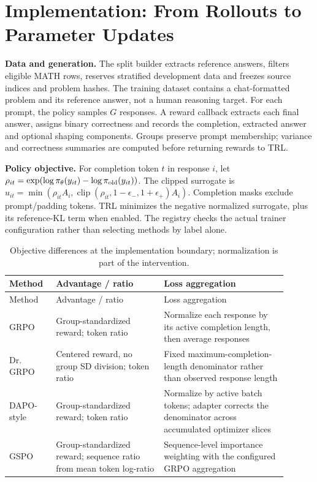 \documentclass[10pt,letterpaper]{article}
\begin{document}
\clearpage

\section{Implementation: From Rollouts to Parameter Updates}

\textbf{Data and generation.} The split builder extracts reference answers, filters eligible MATH rows, reserves stratified development data and freezes source indices and problem hashes. The training dataset contains a chat-formatted problem and its reference answer, not a human reasoning target. For each prompt, the policy samples $G$ responses. A reward callback extracts each final answer, assigns binary correctness and records the completion, extracted answer and optional shaping components. Groups preserve prompt membership; variance and correctness summaries are computed before returning rewards to TRL.

\textbf{Policy objective.} For completion token $t$ in response $i$, let $\rho_{it}=\exp(\log\pi_\theta(y_{it})-\log\pi_{\rm old}(y_{it}))$. The clipped surrogate is $u_{it}=\min(\rho_{it}A_i,\operatorname{clip}(\rho_{it},1-\epsilon_-,1+\epsilon_+)A_i)$. Completion masks exclude prompt/padding tokens. TRL minimizes the negative normalized surrogate, plus its reference-KL term when enabled. The registry checks the actual trainer configuration rather than selecting methods by label alone.

\begingroup\footnotesize\setlength{\tabcolsep}{3pt}
\begin{longtable}{>{\raggedright\arraybackslash}p{0.1440\linewidth}>{\raggedright\arraybackslash}p{0.3510\linewidth}>{\raggedright\arraybackslash}p{0.4050\linewidth}}
\caption{Objective differences at the implementation boundary; normalization is part of the intervention.}\\
\toprule Method & Advantage /\allowbreak{} ratio & Loss aggregation \\
\midrule\endfirsthead
\toprule Method & Advantage /\allowbreak{} ratio & Loss aggregation \\
\midrule\endhead
\midrule\multicolumn{3}{r}{Continued on next page}\endfoot
\bottomrule\endlastfoot
GRPO & Group-standardized reward; token ratio & Normalize each response by its active completion length, then average responses \\
Dr. GRPO & Centered reward, no group SD division; token ratio & Fixed maximum-completion-length denominator rather than observed response length \\
DAPO-style & Group-standardized reward; token ratio & Normalize by active batch tokens; adapter corrects the denominator across accumulated optimizer slices \\
GSPO & Group-standardized reward; sequence ratio from mean token log-ratio & Sequence-level importance weighting with the configured GRPO aggregation \\
\end{longtable}\endgroup
\end{document}
